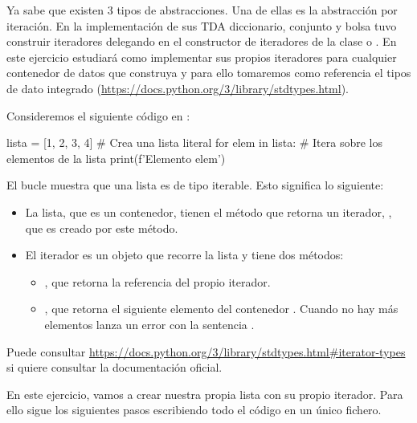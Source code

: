 Ya sabe que existen 3 tipos de abstracciones. Una de ellas es la abstracción por iteración. 
En la implementación de sus TDA diccionario, conjunto y bolsa tuvo construir iteradores delegando en el constructor de iteradores de la clase o .
En este ejercicio estudiará como implementar sus propios iteradores para cualquier contenedor de datos que construya y para ello tomaremos como referencia el tipos de dato integrado  (\url{https://docs.python.org/3/library/stdtypes.html}).


Consideremos el siguiente código en  :
\begin{pyconsole}[][frame=single]
lista = [1, 2, 3, 4] # Crea una lista literal 
for elem in lista:  # Itera sobre los elementos de la lista
  print(f'Elemento {elem}')

\end{pyconsole}

El  bucle  muestra que una lista es de tipo iterable. Esto significa lo siguiente:

\begin{itemize}
\item La lista, que es un contenedor, tienen el método  que retorna un iterador,  , que es creado por este método.
\item El iterador es un objeto que recorre la lista y tiene dos métodos:
	\begin{itemize}
	\item {}, que retorna la referencia del propio iterador.
	\item {}, que retorna el siguiente elemento del contenedor . Cuando no hay más elementos lanza un error con la sentencia .
	\end{itemize}
\end{itemize}

Puede consultar \url{https://docs.python.org/3/library/stdtypes.html#iterator-types} si quiere consultar la documentación oficial.
 
 
En este ejercicio, vamos a crear nuestra propia lista con su propio iterador. Para ello sigue los siguientes pasos escribiendo todo el código en un único fichero.

